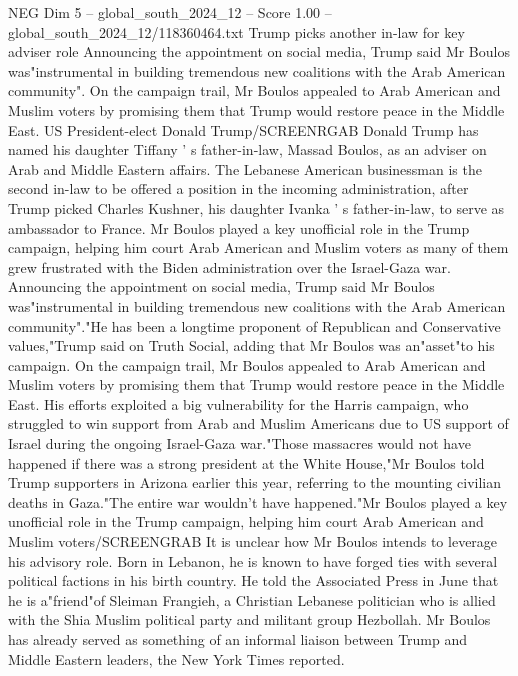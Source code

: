 \begin{textsample}{NEG Dim 5 – global\_south\_2024\_12 – Score 1.00 – global\_south\_2024\_12/118360464.txt}  \label{ex:f5_neg_407}
Trump picks another in-law for key adviser role Announcing the appointment on social media, Trump said Mr Boulos was"instrumental in building tremendous new coalitions with the Arab American community".
On the campaign trail, Mr Boulos appealed to Arab American and Muslim voters by promising them that Trump would restore peace in the Middle East.
US President-elect Donald Trump/SCREENRGAB Donald Trump has named his daughter Tiffany ' s father-in-law, Massad Boulos, as an adviser on Arab and Middle Eastern affairs.
The Lebanese American businessman is the second in-law to be offered a position in the incoming administration, after Trump picked Charles Kushner, his daughter Ivanka ' s father-in-law, to serve as ambassador to France.
Mr Boulos played a key unofficial role in the Trump campaign, helping him court Arab American and Muslim voters as many of them grew frustrated with the Biden administration over the Israel-Gaza war.
Announcing the appointment on social media, Trump said Mr Boulos was"instrumental in building tremendous new coalitions with the Arab American community"."He has been a longtime proponent of Republican and Conservative values,"Trump said on Truth Social, adding that Mr Boulos was an"asset"to his campaign.
On the campaign trail, Mr Boulos appealed to Arab American and Muslim voters by promising them that Trump would restore peace in the Middle East.
His efforts exploited a big vulnerability for the Harris campaign, who struggled to win support from Arab and Muslim Americans due to US support of Israel during the ongoing Israel-Gaza war."Those massacres would not have happened if there was a strong president at the White House,"Mr Boulos told Trump supporters in Arizona earlier this year, referring to the mounting civilian deaths in Gaza."The entire war wouldn't have happened."Mr Boulos played a key unofficial role in the Trump campaign, helping him court Arab American and Muslim voters/SCREENGRAB It is unclear how Mr Boulos intends to leverage his advisory role.
Born in Lebanon, he is known to have forged ties with several political factions in his birth country.
He told the Associated Press in June that he is a"friend"of Sleiman Frangieh, a Christian Lebanese politician who is allied with the Shia Muslim political party and militant group Hezbollah.
Mr Boulos has already served as something of an informal liaison between Trump and Middle Eastern leaders, the New York Times reported.

\end{textsample}
